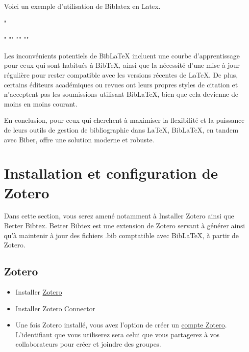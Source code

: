 \documentclass[
  letterpaper,
]{scrbook}
\begin{document}
Voici un exemple d'utilisation de Biblatex en Latex.

"\usepackage[style=apa,url=false,isbn=false,doi=false,backend=biber,language=english,autolang=other]{biblatex}"
""
"\parencite[page]{citationkey}"
"\printbibliography{}"

Les inconvénients potentiels de BibLaTeX incluent une courbe
d'apprentissage pour ceux qui sont habitués à BibTeX, ainsi que la
nécessité d'une mise à jour régulière pour rester compatible avec les
versions récentes de LaTeX. De plus, certains éditeurs académiques ou
revues ont leurs propres styles de citation et n'acceptent pas les
soumissions utilisant BibLaTeX, bien que cela devienne de moins en moins
courant.

En conclusion, pour ceux qui cherchent à maximiser la flexibilité et la
puissance de leurs outils de gestion de bibliographie dans LaTeX,
BibLaTeX, en tandem avec Biber, offre une solution moderne et robuste.

\hypertarget{installation-et-configuration-de-zotero}{%
\section{Installation et configuration de
Zotero}\label{installation-et-configuration-de-zotero}}

Dans cette section, vous serez amené notamment à Installer Zotero ainsi
que Better Bibtex. Better Bibtex est une extension de Zotero servant à
générer ainsi qu'à maintenir à jour des fichiers .bib comptatible avec
BibLaTeX, à partir de Zotero.

\hypertarget{zotero}{%
\subsection{Zotero}\label{zotero}}

\begin{itemize}
\item
  Installer \href{https://www.zotero.org/download/}{Zotero}
\item
  Installer \href{https://www.zotero.org/download/}{Zotero Connector}
\item
  Une fois Zotero installé, vous avez l'option de créer un
  \href{https://www.zotero.org/user/register/}{compte Zotero}.
  L'identifiant que vous utiliserez sera celui que vous partagerez à vos
  collaborateurs pour créer et joindre des groupes.
\end{itemize}
\end{document}
